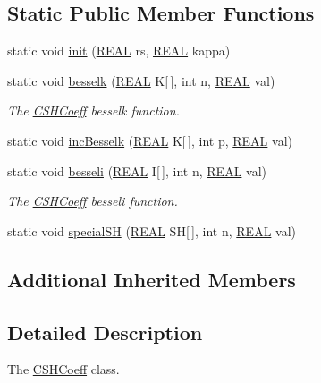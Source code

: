 \subsection*{Static Public Member Functions}
\begin{DoxyCompactItemize}
\item 
static void \hyperlink{classCSHCoeff_ae6ad53fe9a4862de25fe7f2788649a41}{init} (\hyperlink{util_8h_a5821460e95a0800cf9f24c38915cbbde}{R\-E\-A\-L} rs, \hyperlink{util_8h_a5821460e95a0800cf9f24c38915cbbde}{R\-E\-A\-L} kappa)
\item 
static void \hyperlink{classCSHCoeff_acd63e5bb85843c08800a83281f3daad9}{besselk} (\hyperlink{util_8h_a5821460e95a0800cf9f24c38915cbbde}{R\-E\-A\-L} K\mbox{[}$\,$\mbox{]}, int n, \hyperlink{util_8h_a5821460e95a0800cf9f24c38915cbbde}{R\-E\-A\-L} val)
\begin{DoxyCompactList}\small\item\em The \hyperlink{classCSHCoeff}{C\-S\-H\-Coeff} besselk function. \end{DoxyCompactList}\item 
static void \hyperlink{classCSHCoeff_a8fd12308d0884731596cc1268b04d232}{inc\-Besselk} (\hyperlink{util_8h_a5821460e95a0800cf9f24c38915cbbde}{R\-E\-A\-L} K\mbox{[}$\,$\mbox{]}, int p, \hyperlink{util_8h_a5821460e95a0800cf9f24c38915cbbde}{R\-E\-A\-L} val)
\item 
static void \hyperlink{classCSHCoeff_aa6cc07501f3b8ab8d2f9f32ba5a7b279}{besseli} (\hyperlink{util_8h_a5821460e95a0800cf9f24c38915cbbde}{R\-E\-A\-L} I\mbox{[}$\,$\mbox{]}, int n, \hyperlink{util_8h_a5821460e95a0800cf9f24c38915cbbde}{R\-E\-A\-L} val)
\begin{DoxyCompactList}\small\item\em The \hyperlink{classCSHCoeff}{C\-S\-H\-Coeff} besseli function. \end{DoxyCompactList}\item 
static void \hyperlink{classCSHCoeff_ac30535573d45c2da6a424c415967e6f2}{special\-S\-H} (\hyperlink{util_8h_a5821460e95a0800cf9f24c38915cbbde}{R\-E\-A\-L} S\-H\mbox{[}$\,$\mbox{]}, int n, \hyperlink{util_8h_a5821460e95a0800cf9f24c38915cbbde}{R\-E\-A\-L} val)
\end{DoxyCompactItemize}
\subsection*{Additional Inherited Members}


\subsection{Detailed Description}
The \hyperlink{classCSHCoeff}{C\-S\-H\-Coeff} class. 

